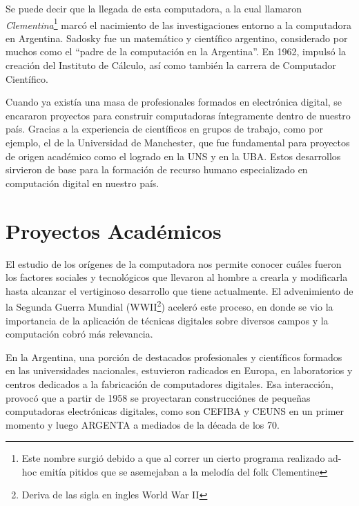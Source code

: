 \documentclass[%
  	final,
%
	notitlepage,
	narroweqnarray,
	inline,
 	twoside,
	]{ieee}
\begin{document}
Se puede decir que la llegada de esta computadora, a la cual llamaron \textit{Clementina}\footnote{Este nombre surgi\'o debido a que al correr un cierto programa realizado ad-hoc emit\'ia pitidos que se asemejaban a la melod\'ia del folk Clementine} marc\'o el nacimiento de las investigaciones entorno a la computadora en Argentina.
Sadosky fue un matem\'atico y cient\'ifico argentino, considerado por muchos como el ``padre de la computaci\'on en la Argentina''.
En 1962, impuls\'o la creaci\'on del Instituto de C\'alculo, as\'i como tambi\'en la carrera de Computador Cient\'ifico.

Cuando ya exist\'ia una masa de profesionales formados en electr\'onica digital, se encararon proyectos para construir computadoras \'integramente dentro de nuestro pa\'is. Gracias a la experiencia de cient\'ificos en grupos de trabajo, como por ejemplo, el de la Universidad de Manchester, que fue fundamental para proyectos de origen acad\'emico como el logrado en la UNS y en la UBA. Estos desarrollos sirvieron de base para la formaci\'on de recurso humano especializado en computaci\'on digital en nuestro pa\'is.

\section{Proyectos Acad\'emicos}

El estudio de los or\'igenes de la computadora nos permite conocer cu\'ales fueron los factores sociales y tecnol\'ogicos que llevaron al hombre a crearla y modificarla hasta alcanzar el vertiginoso desarrollo que tiene actualmente. El advenimiento de la Segunda Guerra Mundial (WWII\footnote{Deriva de las sigla en ingles World War II}) aceler\'o este proceso, en donde se vio la importancia de la aplicaci\'on de t\'ecnicas digitales sobre diversos campos y la computaci\'on cobr\'o m\'as relevancia.

En la Argentina, una porci\'on de destacados profesionales y cient\'ificos formados en las universidades nacionales, estuvieron radicados en Europa, en laboratorios y centros dedicados a la fabricaci\'on de computadores digitales. Esa interacci\'on, provoc\'o que a partir de 1958 se proyectaran construcci\'ones de peque\~nas computadoras electr\'onicas digitales, como son CEFIBA y CEUNS en un primer momento y luego ARGENTA a mediados de la d\'ecada de los 70.
\end{document}
